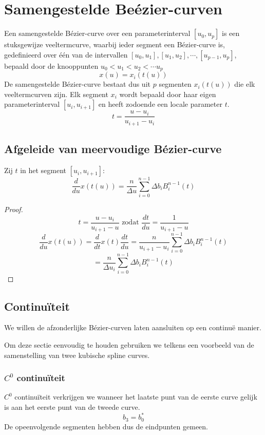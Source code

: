 \documentclass[computergesteund_ontwerp_van_curven_en_oppervlakken.tex]{subfiles}
\begin{document}
\section{Samengestelde Be\'ezier-curven}
Een samengestelde B\'ezier-curve over een parameterinterval $[u_0,u_p]$ is een stuksgewijze veeltermcurve, waarbij ieder segment een B\'ezier-curve is, gedefinieerd over \'e\'en van de intervallen $[u_0,u_1],[u_1,u_2],\cdots,[u_{p-1},u_{p}]$, bepaald door de knooppunten $u_0<u_1<u_2<\cdots u_p$
\[
x(u) = x_i(t(u))
\]
De samengestelde B\'ezier-curve bestaat dus uit $p$ segmenten $x_i(t(u))$ die elk veeltermcurven zijn. Elk segment $x_i$ wordt bepaald door haar eigen parameterinterval $[u_i,u_{i+1}]$ en heeft zodoende een locale parameter $t$.
\[
t = \frac{u-u_i}{u_{i+1}-u_i}
\]

\subsection{Afgeleide van meervoudige B\'ezier-curve}
\begin{ei}
Zij $t$ in het segment $[u_i,u_{i+1}]$:
\[
\frac{d}{du}x(t(u))
= \frac{n}{\Delta u}\sum_{i=0}^{n-1}\Delta b_iB_{i}^{n-1}(t)
\]
\begin{proof}
\[
t = \frac{u-u_i}{u_{i+1}-u} \text{ zodat } \frac{dt}{du} = \frac{1}{u_{i+1}-u}
\]
\[
\frac{d}{du}x(t(u))
= \frac{d}{dt} x(t) \frac{dt}{du}
= \frac{n}{u_{i+1}-u_i}\sum_{i=0}^{n-1}\Delta b_iB_{i}^{n-1}(t)
\]
\[
= \frac{n}{\Delta u_i}\sum_{i=0}^{n-1}\Delta b_iB_{i}^{n-1}(t)
\]
\end{proof}
\end{ei}

\subsection{Continu\"iteit}
We willen de afzonderlijke B\'ezier-curven laten aansluiten op een continu\"e manier.

Om deze sectie eenvoudig te houden gebruiken we telkens een voorbeeld van de samenstelling van twee kubische spline curves.

\subsubsection{$C^{0}$ continu\"iteit}
$C^{0}$ continu\"iteit verkrijgen we wanneer het laatste punt van de eerste curve gelijk is aan het eerste punt van de tweede curve.
\[
b_3 = b_0^*
\]
De opeenvolgende segmenten hebben dus de eindpunten gemeen.
\end{document}
